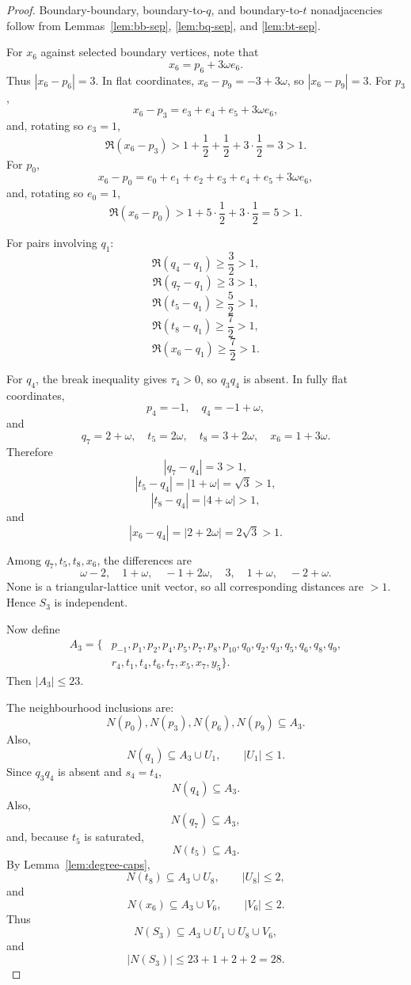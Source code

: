 \documentclass[11pt]{article}
\begin{document}
\begin{proof}
Boundary-boundary, boundary-to-$q$, and boundary-to-$t$ nonadjacencies follow from Lemmas~\ref{lem:bb-sep}, \ref{lem:bq-sep}, and \ref{lem:bt-sep}.

For $x_6$ against selected boundary vertices, note that
\[
  x_6=p_6+3\omega e_6.
\]
Thus $|x_6-p_6|=3$. In flat coordinates, $x_6-p_9=-3+3\omega$, so $|x_6-p_9|=3$. For $p_3$,
\[
  x_6-p_3=e_3+e_4+e_5+3\omega e_6,
\]
and, rotating so $e_3=1$,
\[
  \Re(x_6-p_3)>1+\frac12+\frac12+3\cdot\frac12=3>1.
\]
For $p_0$,
\[
  x_6-p_0=e_0+e_1+e_2+e_3+e_4+e_5+3\omega e_6,
\]
and, rotating so $e_0=1$,
\[
  \Re(x_6-p_0)>1+5\cdot\frac12+3\cdot\frac12=5>1.
\]

For pairs involving $q_1$:
\[
\Re(q_4-q_1)\ge\frac32>1,
\]
\[
\Re(q_7-q_1)\ge3>1,
\]
\[
\Re(t_5-q_1)\ge\frac52>1,
\]
\[
\Re(t_8-q_1)\ge\frac72>1,
\]
\[
\Re(x_6-q_1)\ge\frac72>1.
\]

For $q_4$, the break inequality gives $\tau_4>0$, so $q_3q_4$ is absent. In fully flat coordinates,
\[
  p_4=-1,
  \quad q_4=-1+\omega,
\]
and
\[
  q_7=2+\omega,
  \quad t_5=2\omega,
  \quad t_8=3+2\omega,
  \quad x_6=1+3\omega.
\]
Therefore
\[
|q_7-q_4|=3>1,
\]
\[
|t_5-q_4|=|1+\omega|=\sqrt3>1,
\]
\[
|t_8-q_4|=|4+\omega|>1,
\]
and
\[
|x_6-q_4|=|2+2\omega|=2\sqrt3>1.
\]

Among $q_7,t_5,t_8,x_6$, the differences are
\[
\omega-2,
\quad 1+\omega,
\quad -1+2\omega,
\quad 3,
\quad 1+\omega,
\quad -2+\omega.
\]
None is a triangular-lattice unit vector, so all corresponding distances are $>1$. Hence $S_3$ is independent.

Now define
\[
\begin{aligned}
A_3=\{&p_{-1},p_1,p_2,p_4,p_5,p_7,p_8,p_{10},q_0,q_2,q_3,q_5,q_6,q_8,q_9,\\
&r_4,t_1,t_4,t_6,t_7,x_5,x_7,y_5\}.
\end{aligned}
\]
Then $|A_3|\le23$.

The neighbourhood inclusions are:
\[
N(p_0),N(p_3),N(p_6),N(p_9)\subseteq A_3.
\]
Also,
\[
N(q_1)\subseteq A_3\cup U_1,
\qquad |U_1|\le1.
\]
Since $q_3q_4$ is absent and $s_4=t_4$,
\[
N(q_4)\subseteq A_3.
\]
Also,
\[
N(q_7)\subseteq A_3,
\]
and, because $t_5$ is saturated,
\[
N(t_5)\subseteq A_3.
\]
By Lemma~\ref{lem:degree-caps},
\[
N(t_8)\subseteq A_3\cup U_8,
\qquad |U_8|\le2,
\]
and
\[
N(x_6)\subseteq A_3\cup V_6,
\qquad |V_6|\le2.
\]
Thus
\[
N(S_3)\subseteq A_3\cup U_1\cup U_8\cup V_6,
\]
and
\[
|N(S_3)|\le23+1+2+2=28.
\]
\end{proof}
\end{document}

